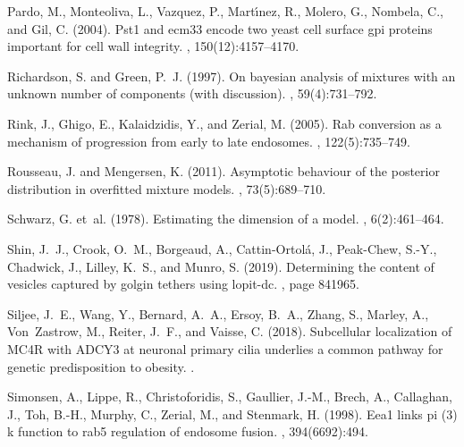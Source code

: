 \documentclass[12pt,english]{article}
\begin{document}
\begin{thebibliography}{}
Pardo, M., Monteoliva, L., Vazquez, P., Mart{\'\i}nez, R., Molero, G., Nombela,
  C., and Gil, C. (2004).
\newblock Pst1 and ecm33 encode two yeast cell surface gpi proteins important
  for cell wall integrity.
, 150(12):4157--4170.

Richardson, S. and Green, P.~J. (1997).
\newblock On bayesian analysis of mixtures with an unknown number of components
  (with discussion).
, 59(4):731--792.

Rink, J., Ghigo, E., Kalaidzidis, Y., and Zerial, M. (2005).
\newblock Rab conversion as a mechanism of progression from early to late
  endosomes.
, 122(5):735--749.

Rousseau, J. and Mengersen, K. (2011).
\newblock Asymptotic behaviour of the posterior distribution in overfitted
  mixture models.
, 73(5):689--710.

Schwarz, G. et~al. (1978).
\newblock Estimating the dimension of a model.
, 6(2):461--464.

Shin, J.~J., Crook, O.~M., Borgeaud, A., Cattin-Ortol{\'a}, J., Peak-Chew,
  S.-Y., Chadwick, J., Lilley, K.~S., and Munro, S. (2019).
\newblock Determining the content of vesicles captured by golgin tethers using
  lopit-dc.
, page 841965.

Siljee, J.~E., Wang, Y., Bernard, A.~A., Ersoy, B.~A., Zhang, S., Marley, A.,
  Von~Zastrow, M., Reiter, J.~F., and Vaisse, C. (2018).
\newblock Subcellular localization of {MC4R} with {ADCY3} at neuronal primary
  cilia underlies a common pathway for genetic predisposition to obesity.
.

Simonsen, A., Lippe, R., Christoforidis, S., Gaullier, J.-M., Brech, A.,
  Callaghan, J., Toh, B.-H., Murphy, C., Zerial, M., and Stenmark, H. (1998).
\newblock Eea1 links pi (3) k function to rab5 regulation of endosome fusion.
, 394(6692):494.


\end{thebibliography}
\end{document}
